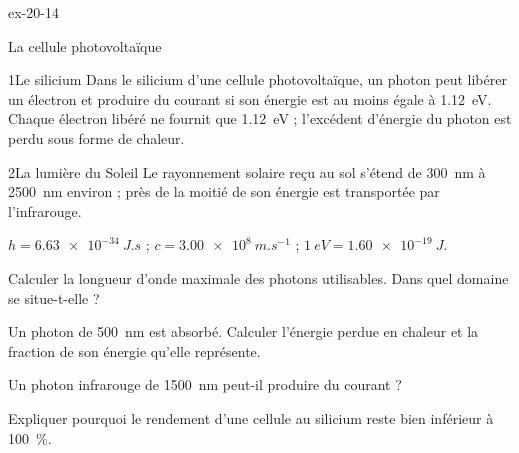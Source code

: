 \begin{blocLivre}{ex-20-14}
\begin{exercice}[3]{La cellule photovoltaïque}
\begin{docu}{1}{Le silicium}
Dans le silicium d'une cellule photovoltaïque, un photon peut libérer un électron et produire du courant si son énergie est au moins
égale à \qty{1,12}{eV}. Chaque électron libéré ne fournit que \qty{1,12}{eV} ; l'excédent d'énergie du photon est perdu sous forme de chaleur.
\end{docu}
\begin{docu}{2}{La lumière du Soleil}
Le rayonnement solaire reçu au sol s'étend de \qty{300}{nm} à \qty{2500}{nm} environ ; près de la moitié de son énergie est transportée par
l'infrarouge.
\end{docu}
\begin{donnees}
$h=\qty{6,63e-34}{J.s}$ ; $c=\qty{3,00e8}{m.s^{-1}}$ ; $\qty{1}{eV}=\qty{1,60e-19}{J}$.
\end{donnees}
\begin{questions}
\item Calculer la longueur d'onde maximale des photons utilisables. Dans quel domaine se situe-t-elle ?
\item Un photon de \qty{500}{nm} est absorbé. Calculer l'énergie perdue en chaleur et la fraction de son énergie qu'elle représente.
\item Un photon infrarouge de \qty{1500}{nm} peut-il produire du courant ?
\item \initiative Expliquer pourquoi le rendement d'une cellule au silicium reste bien inférieur à \qty{100}{\percent}.
\end{questions}
\end{exercice}
\end{blocLivre}
